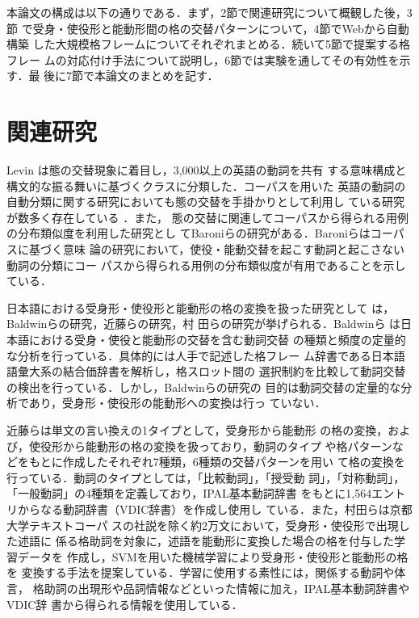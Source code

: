 \documentclass[japanese]{jnlp_1.4}
\begin{document}
 本論文の構成は以下の通りである．まず，2節で関連研究について概観した後，3節
 で受身・使役形と能動形間の格の交替パターンについて，4節でWebから自動構築
 した大規模格フレームについてそれぞれまとめる．続いて5節で提案する格フレー
 ムの対応付け手法について説明し，6節では実験を通してその有効性を示す．最
 後に7節で本論文のまとめを記す．


 \section{関連研究} 

 Levin \citeyear{Levin1993}は態の交替現象に着目し，3,000以上の英語の動詞を共有
 する意味構成と構文的な振る舞いに基づくクラスに分類した．コーパスを用いた
 英語の動詞の自動分類に関する研究においても態の交替を手掛かりとして利用し
 ている研究が数多く存在している
 \cite{Lapata2004CL,Walde2008,Joanis2008,Li2008,Sun2009,Sun2013}．また，
 態の交替に関連してコーパスから得られる用例の分布類似度を利用した研究とし
 てBaroniらの研究\cite{Baroni2010}がある．Baroniらはコーパスに基づく意味
 論の研究において，使役・能動交替を起こす動詞と起こさない動詞の分類にコー
 パスから得られる用例の分布類似度が有用であることを示している．

 日本語における受身形・使役形と能動形の格の変換を扱った研究として
 は，Baldwinらの研究\cite{Baldwin2000}，近藤らの研究\cite{Kondo2001}，村
 田らの研究\cite{Murata2002,Murata2008}が挙げられる．Baldwinら
 \cite{Baldwin2000}は日本語における受身・使役と能動形の交替を含む動詞交替
 の種類と頻度の定量的な分析を行っている．具体的には人手で記述した格フレー
 ム辞書である日本語語彙大系\cite{NTT}の結合価辞書を解析し，格スロット間の
 選択制約を比較して動詞交替の検出を行っている．しかし，Baldwinらの研究の
 目的は動詞交替の定量的な分析であり，受身形・使役形の能動形への変換は行っ
 ていない．

 近藤ら\citeyear{Kondo2001}は単文の言い換えの1タイプとして，受身形から能動形
 の格の変換，および，使役形から能動形の格の変換を扱っており，動詞のタイプ
 や格パターンなどをもとに作成したそれぞれ7種類，6種類の交替パターンを用い
 て格の変換を行っている．動詞のタイプとしては，「比較動詞」，「授受動
 詞」，「対称動詞」，「一般動詞」の4種類を定義しており，IPAL基本動詞辞書
 \cite{IPAL}をもとに1,564エントリからなる動詞辞書（VDIC辞書）を作成し使用し
 ている．また，村田ら\cite{Murata2002,Murata2008}は京都大学テキストコーパ
 ス\cite{TAG}の社説を除く約2万文において，受身形・使役形で出現した述語に
 係る格助詞を対象に，述語を能動形に変換した場合の格を付与した学習データを
 作成し，SVM\cite{SVM}を用いた機械学習により受身形・使役形と能動形の格を
 変換する手法を提案している．学習に使用する素性には，関係する動詞や体言，
 格助詞の出現形や品詞情報などといった情報に加え，IPAL基本動詞辞書やVDIC辞
 書から得られる情報を使用している．
\end{document}
